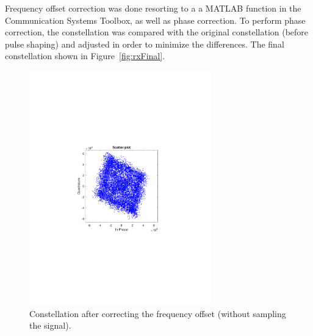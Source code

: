 Frequency offset correction was done resorting to a a MATLAB function in the Communication Systems Toolbox, as well as phase correction. To perform phase correction, the constellation was compared with the original constellation (before pulse shaping) and adjusted in order to minimize the differences. The final constellation shown in Figure~\ref{fig:rxFinal}.

\begin{figure}[H]
	\centering
	\includegraphics[clip, trim=4cm 8cm 4cm 8cm, width=0.7\textwidth]{./sdf/m_qam_system/figures/exp/const-wvCorr.pdf}
	\caption{Constellation after correcting the frequency offset (without sampling the signal).}
	\label{fig:rxWvCorr}
\end{figure}

